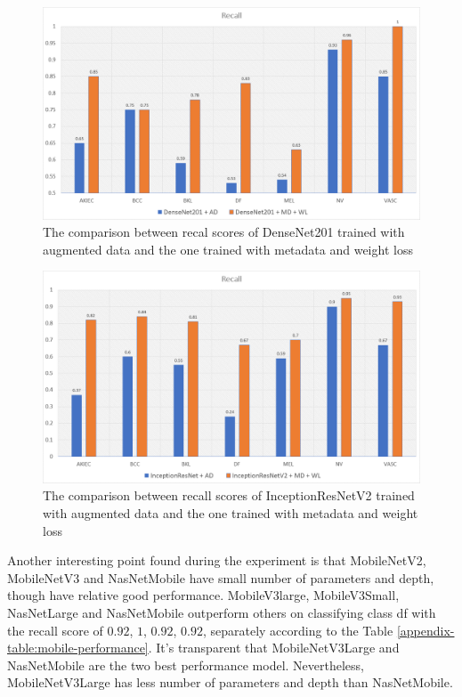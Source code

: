 \documentclass[sensors,article,submit,pdftex,moreauthors]{Definitions/mdpi}
\begin{document}
\begin{figure}[H]
	\centering
	\includegraphics[width=1\linewidth]{Definitions/den re}
	\caption{The comparison between recal scores of DenseNet201 trained with augmented data and the one trained with metadata and weight loss}
	\label{fig:den recall}
\end{figure}

\begin{figure}[H]
	\centering
	\includegraphics[width=1\linewidth]{Definitions/in re}
	\caption{The comparison between recall scores of InceptionResNetV2 trained with augmented data and the one trained with metadata and weight loss}
	\label{fig:incep recall}
\end{figure}

Another interesting point found during the experiment is that MobileNetV2, MobileNetV3 and NasNetMobile have small number of parameters and depth, though have relative good performance. MobileV3large, MobileV3Small, NasNetLarge and NasNetMobile outperform others on classifying class df with the recall score of $0.92$, $1$, $0.92$, $0.92$, separately according to the Table \ref{appendix-table:mobile-performance}. It's transparent that MobileNetV3Large and NasNetMobile are the two best performance model. Nevertheless, MobileNetV3Large has less number of parameters and depth than NasNetMobile.
\end{document}
